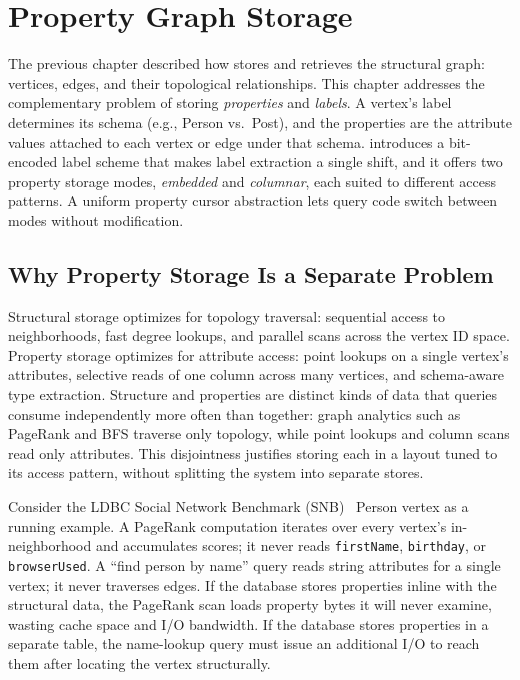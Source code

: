 \chapter{Property Graph Storage}
\label{sec:architecture:property}

The previous chapter described how \project{} stores and retrieves the structural graph: vertices, edges, and their topological relationships.
This chapter addresses the complementary problem of storing \emph{properties} and \emph{labels}.
A vertex's label determines its schema (e.g., Person vs.\ Post), and the properties are the attribute values attached to each vertex or edge under that schema.
\project{} introduces a bit-encoded label scheme that makes label extraction a single shift, and it offers two property storage modes, \emph{embedded} and \emph{columnar}, each suited to different access patterns.
A uniform property cursor abstraction lets query code switch between modes without modification.

\section{Why Property Storage Is a Separate Problem}
\label{arch:prop-motivation}

Structural storage optimizes for topology traversal: sequential access to neighborhoods, fast degree lookups, and parallel scans across the vertex ID space.
Property storage optimizes for attribute access: point lookups on a single vertex's attributes, selective reads of one column across many vertices, and schema-aware type extraction.
Structure and properties are distinct kinds of data that queries consume independently more often than together: graph analytics such as PageRank and BFS traverse only topology, while point lookups and column scans read only attributes.
This disjointness justifies storing each in a layout tuned to its access pattern, without splitting the system into separate stores.

Consider the LDBC Social Network Benchmark (SNB)~\cite{erling2015ldbc} Person vertex as a running example.
A PageRank computation iterates over every vertex's in-neighborhood and accumulates scores; it never reads \texttt{firstName}, \texttt{birthday}, or \texttt{browserUsed}.
A ``find person by name'' query reads string attributes for a single vertex; it never traverses edges.
If the database stores properties inline with the structural data, the PageRank scan loads property bytes it will never examine, wasting cache space and I/O bandwidth.
If the database stores properties in a separate table, the name-lookup query must issue an additional I/O to reach them after locating the vertex structurally.

